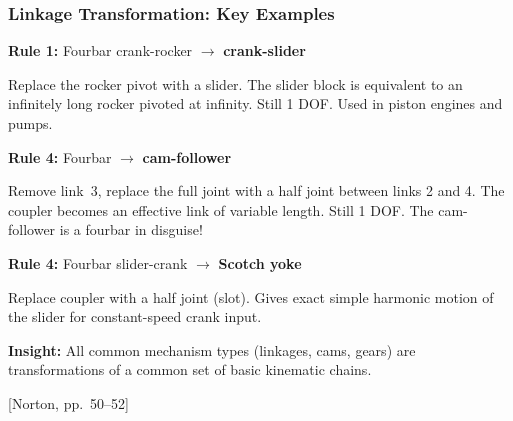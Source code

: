 \documentclass[10pt,aspectratio=43]{beamer}
\newcommand{\pref}[1]{\vfill\hfill{\scriptsize\color{gray}[Norton, pp.~#1]}}
\begin{document}
\begin{frame}
\frametitle{Linkage Transformation: Key Examples}

\textbf{Rule 1:} Fourbar crank-rocker $\to$ \textbf{crank-slider}

Replace the rocker pivot with a slider. The slider block is equivalent to an infinitely long rocker pivoted at infinity. Still 1 DOF. Used in piston engines and pumps.

\vspace{6pt}
\textbf{Rule 4:} Fourbar $\to$ \textbf{cam-follower}

Remove link~3, replace the full joint with a half joint between links 2 and 4. The coupler becomes an effective link of variable length. Still 1 DOF. The cam-follower is a fourbar in disguise!

\vspace{6pt}
\textbf{Rule 4:} Fourbar slider-crank $\to$ \textbf{Scotch yoke}

Replace coupler with a half joint (slot). Gives exact simple harmonic motion of the slider for constant-speed crank input.

\vspace{4pt}
\begin{greenbox}
\textbf{Insight:} All common mechanism types (linkages, cams, gears) are transformations of a common set of basic kinematic chains.
\end{greenbox}
\pref{50--52}
\end{frame}

\end{document}
